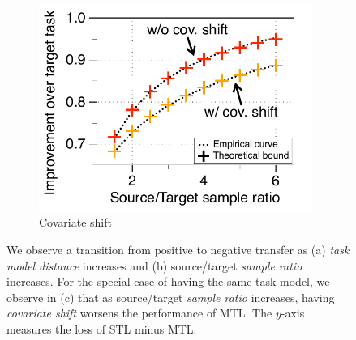 \begin{figure}[!t]
\begin{subfigure}[b]{0.32\textwidth}
		\centering
		\includegraphics[width=0.98\textwidth]{figures/complementary.pdf}
		\vspace{-0.075in}
		\caption{Covariate shift}
		\label{fig_covariate}
	\end{subfigure}
	\vspace{-0.05in}
	\caption{%
	We observe a transition from positive to negative transfer as (a) \textit{task model distance} increases and (b) source/target \textit{sample ratio} increases.
	For the special case of having the same task model, we observe in (c) that as source/target \textit{sample ratio} increases, having \textit{covariate shift} worsens the performance of MTL.
	The $y$-axis measures the loss of STL minus MTL.}
	\label{fig_model_shift_phasetrans}
	\vspace{-0.2in}
\end{figure}




